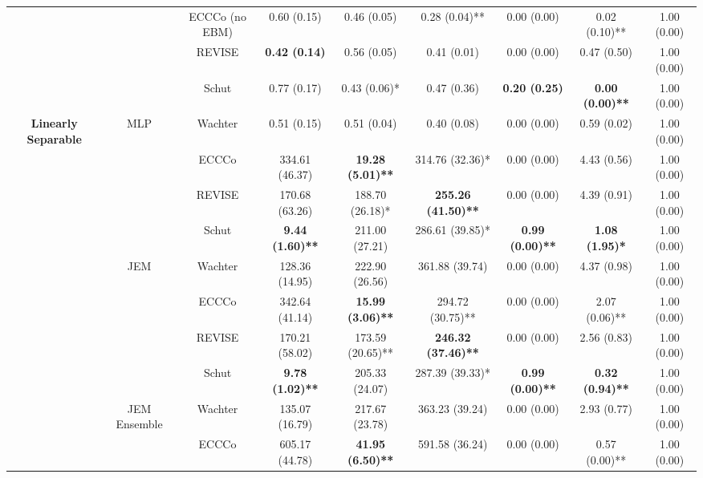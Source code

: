 \begin{table}
{\begin{tabular}[t]{>{}c|c|c|c|c|c|c|c|c}
 &  & ECCCo (no EBM) & 0.60 (0.15) & 0.46 (0.05) & 0.28 (0.04)** & 0.00 (0.00) & 0.02 (0.10)** & 1.00 (0.00)\\

 &  & REVISE & \textbf{0.42 (0.14)} & 0.56 (0.05) & 0.41 (0.01) & 0.00 (0.00) & 0.47 (0.50) & 1.00 (0.00)\\

 &  & Schut & 0.77 (0.17) & 0.43 (0.06)* & 0.47 (0.36) & \textbf{0.20 (0.25)} & \textbf{0.00 (0.00)**} & 1.00 (0.00)\\

\multirow{-12}{*}{\centering\arraybackslash \textbf{Linearly Separable}} & \multirow{-6}{*}{\centering\arraybackslash MLP} & Wachter & 0.51 (0.15) & 0.51 (0.04) & 0.40 (0.08) & 0.00 (0.00) & 0.59 (0.02) & 1.00 (0.00)\\
\cline{1-9}
 &  & ECCCo & 334.61 (46.37) & \textbf{19.28 (5.01)**} & 314.76 (32.36)* & 0.00 (0.00) & 4.43 (0.56) & 1.00 (0.00)\\

 &  & REVISE & 170.68 (63.26) & 188.70 (26.18)* & \textbf{255.26 (41.50)**} & 0.00 (0.00) & 4.39 (0.91) & 1.00 (0.00)\\

 &  & Schut & \textbf{9.44 (1.60)**} & 211.00 (27.21) & 286.61 (39.85)* & \textbf{0.99 (0.00)**} & \textbf{1.08 (1.95)*} & 1.00 (0.00)\\

 & \multirow{-4}{*}{\centering\arraybackslash JEM} & Wachter & 128.36 (14.95) & 222.90 (26.56) & 361.88 (39.74) & 0.00 (0.00) & 4.37 (0.98) & 1.00 (0.00)\\
\cline{2-9}
 &  & ECCCo & 342.64 (41.14) & \textbf{15.99 (3.06)**} & 294.72 (30.75)** & 0.00 (0.00) & 2.07 (0.06)** & 1.00 (0.00)\\

 &  & REVISE & 170.21 (58.02) & 173.59 (20.65)** & \textbf{246.32 (37.46)**} & 0.00 (0.00) & 2.56 (0.83) & 1.00 (0.00)\\

 &  & Schut & \textbf{9.78 (1.02)**} & 205.33 (24.07) & 287.39 (39.33)* & \textbf{0.99 (0.00)**} & \textbf{0.32 (0.94)**} & 1.00 (0.00)\\

 & \multirow{-4}{*}{\centering\arraybackslash JEM Ensemble} & Wachter & 135.07 (16.79) & 217.67 (23.78) & 363.23 (39.24) & 0.00 (0.00) & 2.93 (0.77) & 1.00 (0.00)\\
\cline{2-9}
 &  & ECCCo & 605.17 (44.78) & \textbf{41.95 (6.50)**} & 591.58 (36.24) & 0.00 (0.00) & 0.57 (0.00)** & 1.00 (0.00)\\


\end{tabular}}
\end{table}

